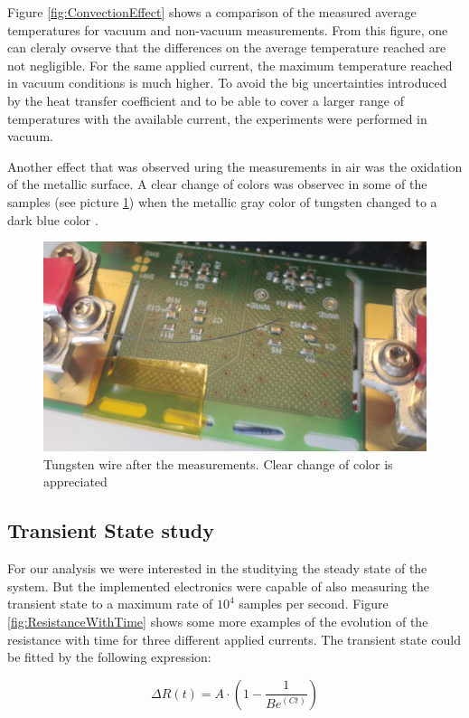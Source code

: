 Figure \ref{fig:ConvectionEffect} shows a comparison of the measured average temperatures for vacuum and non-vacuum measurements. From this figure, one can cleraly ovserve that the differences on the average temperature reached are not negligible. For the same applied current, the maximum temperature reached in vacuum conditions is much higher. To avoid the big uncertainties introduced by the heat transfer coefficient and to be able to cover a larger range of temperatures with the available current, the experiments were performed in vacuum. 

Another effect that was observed uring the measurements in air was the oxidation of the metallic surface. A clear change of colors was observec in some of the samples (see picture \ref{fig:Oxidation}) when the metallic gray color of tungsten changed to a dark blue color \parencite[][]{ref:CiteOxidation}.

\begin{figure}[h]
    \centering
    \includegraphics[width=0.7\columnwidth]{Figure_ColorChange/PictureWire.jpg}
    \caption{Tungsten wire after the measurements. Clear change of color is appreciated}
    \label{fig:Oxidation}
\end{figure}

\subsection{Transient State study}

For our analysis we were interested in the studitying the steady state of the system. But the implemented electronics were capable of also measuring the transient state to a maximum rate of $10^{4}$ samples per second. Figure \ref{fig:ResistanceWithTime} shows some more examples of the evolution of the resistance with time for three different applied currents. The transient state could be fitted by the following expression: 

\begin{equation}
    \Delta R (t) = A\cdot \left( 1 - \frac{1}{B e^{ \left( Ct \right)}}\right)
    \label{eq:Rt}
\end{equation}

